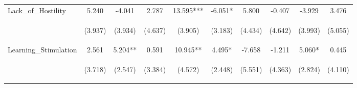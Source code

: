\begin{tabular}{lccccccccc}
\noalign{\smallskip}Lack_of_Hostility & 5.240 & -4.041 & 2.787 & 13.595*** & -6.051* & 5.800 & -0.407 & -3.929 & 3.476\\
 & \begin{footnotesize}(3.937)\end{footnotesize} & \begin{footnotesize}(3.934)\end{footnotesize} & \begin{footnotesize}(4.637)\end{footnotesize} & \begin{footnotesize}(3.905)\end{footnotesize} & \begin{footnotesize}(3.183)\end{footnotesize} & \begin{footnotesize}(4.434)\end{footnotesize} & \begin{footnotesize}(4.642)\end{footnotesize} & \begin{footnotesize}(3.993)\end{footnotesize} & \begin{footnotesize}(5.055)\end{footnotesize}\\
\noalign{\smallskip}Learning_Stimulation & 2.561 & 5.204** & 0.591 & 10.945** & 4.495* & -7.658 & -1.211 & 5.060* & 0.445\\
 & \begin{footnotesize}(3.718)\end{footnotesize} & \begin{footnotesize}(2.547)\end{footnotesize} & \begin{footnotesize}(3.384)\end{footnotesize} & \begin{footnotesize}(4.572)\end{footnotesize} & \begin{footnotesize}(2.448)\end{footnotesize} & \begin{footnotesize}(5.551)\end{footnotesize} & \begin{footnotesize}(4.363)\end{footnotesize} & \begin{footnotesize}(2.824)\end{footnotesize} & \begin{footnotesize}(4.110)\end{footnotesize}\\

\end{tabular}
